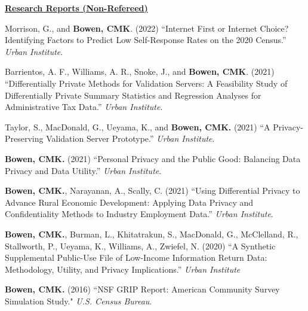 \documentclass[11pt, letterpaper, roman]{moderncv} %
\begin{document}
\vspace{4pt}
\noindent\underline{\textbf{Research Reports (Non-Refereed)}}
\vspace{4pt}
\begin{etaremune}[topsep=0pt, itemsep=3pt, partopsep=0pt, parsep=0pt]
    \item Morrison, G., and \textbf{Bowen, CMK}. (2022) ``Internet First or Internet Choice? Identifying Factors to Predict Low Self-Response Rates on the 2020 Census.'' \textit{Urban Institute}.
    
    \item Barrientos, A. F., Williams, A. R., Snoke, J., and \textbf{Bowen, CMK}. (2021) ``Differentially Private Methods for Validation Servers: A Feasibility Study of Differentially Private Summary Statistics and Regression Analyses for Administrative Tax Data.'' \textit{Urban Institute}.
    
    \item Taylor, S., MacDonald, G., Ueyama, K., and \textbf{Bowen, CMK.} (2021) ``A Privacy-Preserving Validation Server Prototype.'' \textit{Urban Institute}.
        
    \item \textbf{Bowen, CMK.} (2021) ``Personal Privacy and the Public Good: Balancing Data Privacy and Data Utility.'' \textit{Urban Institute}.
    
    \item \textbf{Bowen, CMK.}, Narayanan, A., Scally, C. (2021) ``Using Differential Privacy to Advance Rural Economic Development: Applying Data Privacy and Confidentiality Methods to Industry Employment Data.'' \textit{Urban Institute}.
    
    \item \textbf{Bowen, CMK.}, Burman, L., Khitatrakun, S., MacDonald, G., McClelland, R., Stallworth, P., Ueyama, K., Williams, A., Zwiefel, N. (2020) ``A Synthetic Supplemental Public-Use File of Low-Income Information Return Data: Methodology, Utility, and Privacy Implications.'' \textit{Urban Institute}
    
    \item \textbf{Bowen, CMK.} (2016) ``NSF GRIP Report: American Community Survey Simulation Study." \textit{U.S. Census Bureau}.  
\end{etaremune}
\end{document}
